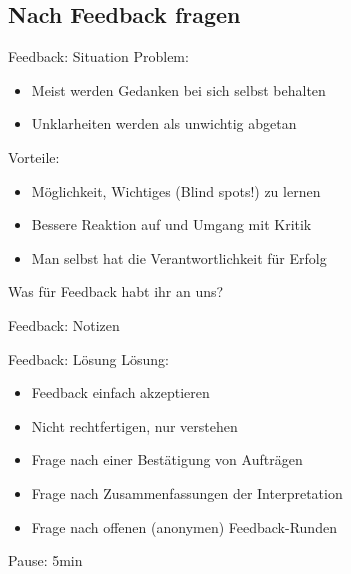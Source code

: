 \subsection{Nach Feedback fragen}

\begin{frame}[c]{Feedback: Situation}
    \large
    Problem:
    \begin{itemize}[<+(1)->]
        \item Meist werden Gedanken bei sich selbst behalten
        \item Unklarheiten werden als unwichtig abgetan
    \end{itemize}
    \pause
    Vorteile:
    \begin{itemize}[<+(1)->]
        \item Möglichkeit, Wichtiges (Blind spots!) zu lernen
        \item Bessere Reaktion auf und Umgang mit Kritik
        \item Man selbst hat die Verantwortlichkeit für Erfolg
    \end{itemize}
\end{frame}

\begin{frame}[standout]
    Was für Feedback habt ihr an uns?
\end{frame}

\begin{frame}[c]{Feedback: Notizen}

\end{frame}

\begin{frame}[c]{Feedback: Lösung}
    \large
    Lösung:
    \begin{itemize}[<+(1)->]
        \item Feedback einfach akzeptieren
        \item Nicht rechtfertigen, nur verstehen
        \item Frage nach einer Bestätigung von Aufträgen
        \item Frage nach Zusammenfassungen der Interpretation
        \item Frage nach offenen (anonymen) Feedback-Runden
    \end{itemize}
\end{frame}



\begin{frame}[standout]
    Pause: 5min
\end{frame}




